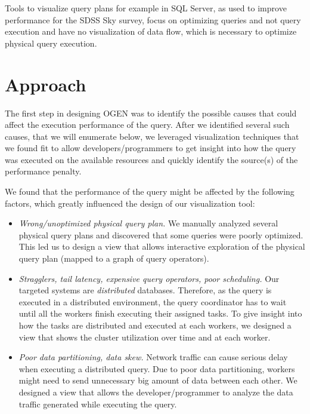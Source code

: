\documentclass{chi2009}
\newcommand*{\system}{OGEN\xspace}
\begin{document}
Tools to visualize query plans for example in SQL Server, as used to improve performance for the SDSS Sky survey\cite{szalay2002sdss}, focus on optimizing queries and not query execution and have no visualization of data flow, which is necessary to optimize physical query execution.

\section{Approach}
\label{sec:approach}


The first step in designing \system was to identify the possible causes that
could affect the execution performance of the query. After we identified
several such causes, that we will enumerate below, we leveraged visualization
techniques that we found fit to allow developers/programmers to get insight
into how the query was executed on the available resources and quickly
identify the source(s) of the performance penalty.

We found that the performance of the query might be affected by the following
factors, which greatly influenced the design of our visualization tool:
\begin{itemize}
   \item \emph{Wrong/unoptimized physical query plan.} We manually analyzed
several physical query plans and discovered that some queries were poorly
optimized. This led us to design a view that allows interactive exploration of
the physical query plan (mapped to a graph of query operators).
   \item \emph{Stragglers, tail latency, expensive query operators, poor
scheduling.} Our targeted systems are \emph{distributed} databases. Therefore,
as the query is executed in a distributed environment, the query coordinator
has to wait until all the workers finish executing their assigned tasks. To
give insight into how the tasks are distributed and executed at each workers,
we designed a view that shows the cluster utilization over time and at each
worker.
   \item \emph{Poor data partitioning, data skew.} Network traffic can cause
serious delay when executing a distributed query. Due to poor data
partitioning, workers might need to send unnecessary big amount of data between
each other. We designed a view that allows the developer/programmer to analyze
the data traffic generated while executing the query.
\end{itemize}
\end{document}
